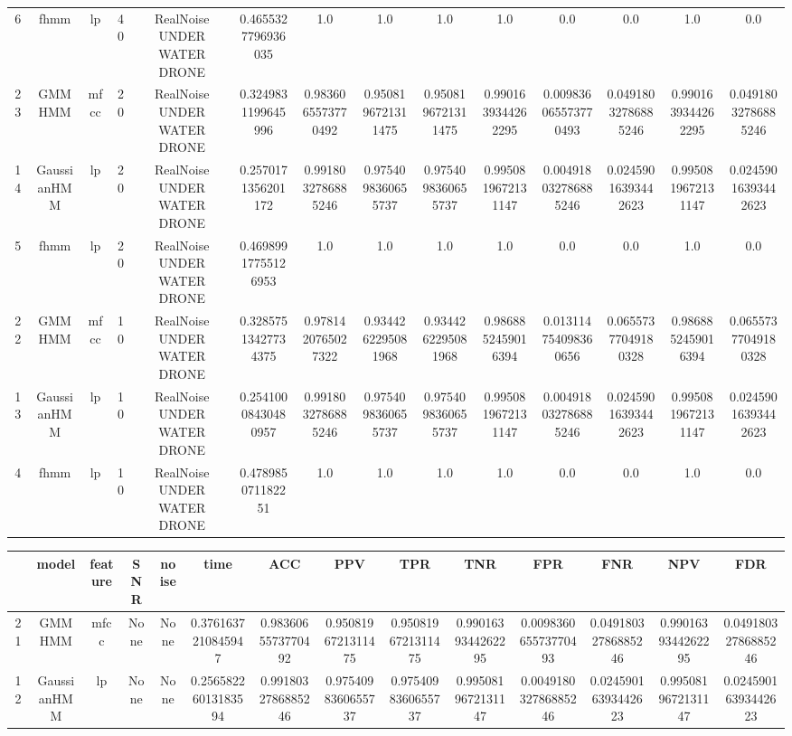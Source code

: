\begin{table}[htb]
\begin{tabular}{@{}cccccccccccccc@{}}
        6 & fhmm & lp & 40 & RealNoise UNDER WATER DRONE & 0.4655327796936035 & 1.0 & 1.0 & 1.0 & 1.0 & 0.0 & 0.0 & 1.0 & 0.0 \\
        23 & GMMHMM & mfcc & 20 & RealNoise UNDER WATER DRONE & 0.3249831199645996 & 0.9836065573770492 & 0.9508196721311475 & 0.9508196721311475 & 0.9901639344262295 & 0.009836065573770493 & 0.04918032786885246 & 0.9901639344262295 & 0.04918032786885246 \\
        14 & GaussianHMM & lp & 20 & RealNoise UNDER WATER DRONE & 0.2570171356201172 & 0.9918032786885246 & 0.9754098360655737 & 0.9754098360655737 & 0.9950819672131147 & 0.004918032786885246 & 0.02459016393442623 & 0.9950819672131147 & 0.02459016393442623 \\
        5 & fhmm & lp & 20 & RealNoise UNDER WATER DRONE & 0.46989917755126953 & 1.0 & 1.0 & 1.0 & 1.0 & 0.0 & 0.0 & 1.0 & 0.0 \\
        22 & GMMHMM & mfcc & 10 & RealNoise UNDER WATER DRONE & 0.32857513427734375 & 0.9781420765027322 & 0.9344262295081968 & 0.9344262295081968 & 0.9868852459016394 & 0.013114754098360656 & 0.06557377049180328 & 0.9868852459016394 & 0.06557377049180328 \\
        13 & GaussianHMM & lp & 10 & RealNoise UNDER WATER DRONE & 0.25410008430480957 & 0.9918032786885246 & 0.9754098360655737 & 0.9754098360655737 & 0.9950819672131147 & 0.004918032786885246 & 0.02459016393442623 & 0.9950819672131147 & 0.02459016393442623 \\
        4 & fhmm & lp & 10 & RealNoise UNDER WATER DRONE & 0.478985071182251 & 1.0 & 1.0 & 1.0 & 1.0 & 0.0 & 0.0 & 1.0 & 0.0 \\
        \bottomrule
    \end{tabular}
\end{table}\begin{table}[htb]
    \centering
    \begin{tabular}{@{}cccccccccccccc@{}}
        \toprule
         & model & feature & SNR & noise & time & ACC & PPV & TPR & TNR & FPR & FNR & NPV & FDR \\
        \midrule
        21 & GMMHMM & mfcc & None & None & 0.3761637210845947 & 0.9836065573770492 & 0.9508196721311475 & 0.9508196721311475 & 0.9901639344262295 & 0.009836065573770493 & 0.04918032786885246 & 0.9901639344262295 & 0.04918032786885246 \\
        12 & GaussianHMM & lp & None & None & 0.25658226013183594 & 0.9918032786885246 & 0.9754098360655737 & 0.9754098360655737 & 0.9950819672131147 & 0.004918032786885246 & 0.02459016393442623 & 0.9950819672131147 & 0.02459016393442623 \\

\end{tabular}
\end{table}
